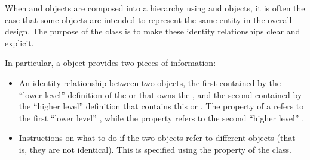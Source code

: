 When  and  objects are composed into a hierarchy using  and  objects, it is often the case that some  objects are intended to represent the same entity in the overall design. The purpose of the  class is to make these identity relationships clear and explicit.

In particular, a  object provides two pieces of information:
\begin{itemize}
\item An identity relationship between two  objects, the first contained by the ``lower level'' definition of the  or  that owns the
  , and the second contained by the ``higher level'' definition that contains this  or . The  property of a  refers to the first ``lower level'' , while the  property refers to the second ``higher level'' .
\item Instructions on what to do if the two  objects refer to different  objects (that is, they are not identical). This is specified using the  property of the  class.
\end{itemize}

